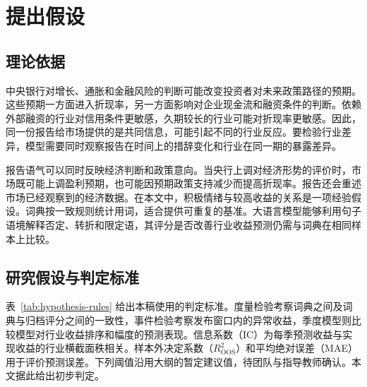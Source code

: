 \section{提出假设}
\label{sec:hypotheses}

\subsection{理论依据}

中央银行对增长、通胀和金融风险的判断可能改变投资者对未来政策路径的预期。这些预期一方面进入折现率，另一方面影响对企业现金流和融资条件的判断。依赖外部融资的行业对信用条件更敏感，久期较长的行业可能对折现率更敏感。因此，同一份报告给市场提供的是共同信息，可能引起不同的行业反应。要检验行业差异，模型需要同时观察报告在时间上的措辞变化和行业在同一期的暴露差异。

报告语气可以同时反映经济判断和政策意向。当央行上调对经济形势的评价时，市场既可能上调盈利预期，也可能因预期政策支持减少而提高折现率。报告还会重述市场已经观察到的经济数据。在本文中，积极情绪与较高收益的关系是一项经验假设。词典按一致规则统计用词，适合提供可重复的基准。大语言模型能够利用句子语境解释否定、转折和限定语，其评分是否改善行业收益预测仍需与词典在相同样本上比较。

\subsection{研究假设与判定标准}

表~\ref{tab:hypothesis-rules} 给出本稿使用的判定标准。度量检验考察词典之间及词典与归档评分之间的一致性，事件检验考察发布窗口内的异常收益，季度模型则比较模型对行业收益排序和幅度的预测表现。信息系数（IC）为每季预测收益与实现收益的行业横截面秩相关。样本外决定系数（$R^2_{\mathrm{OOS}}$）和平均绝对误差（MAE）用于评价预测误差。下列阈值沿用大纲的暂定建议值，待团队与指导教师确认。本文据此给出初步判定。

